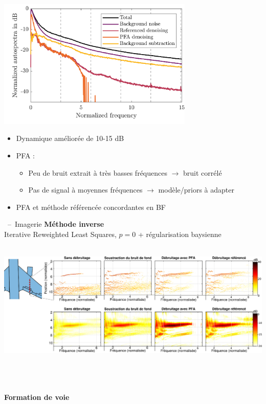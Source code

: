 \documentclass[10pt,xcolor=x11names,compress, show notes]{beamer}%
\begin{document}
\begin{frame}{\insertsectionhead}
	\centering
	\includegraphics[width=0.7\textwidth]{airbus/mean_as.png}\\
	\vfill
		\begin{itemize}
        		\item Dynamique améliorée de 10-15 dB
        		\item PFA :        \begin{itemize}
       		 	\item Peu de bruit extrait à très basses fréquences $\rightarrow$ bruit corrélé
       		 	\item Pas de signal à moyennes fréquences $\rightarrow$ modèle/priors à adapter
		\end{itemize}
		\item PFA et méthode référencée concordantes en BF
		
	\end{itemize}
\end{frame}


\begin{frame}[t]{\insertsectionhead~--~Imagerie}
\centering
\textbf{ Méthode inverse}\\
{\small Iterative Reweighted Least Squares, $p=0$ + régularisation baysienne}\\~\\

\begin{minipage}{1.1\textwidth}
	\hspace{-0.65cm}\includegraphics[width=\textwidth]{airbus/imagerie_final.eps}
\end{minipage}~\\~\\~\\
\textbf{Formation de voie}
\end{frame}
\end{document}
